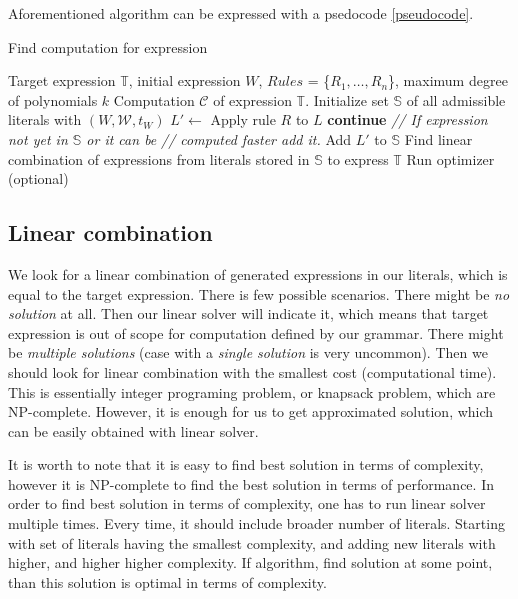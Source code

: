 \documentclass{article}
\begin{document}
Aforementioned algorithm can be expressed with a psedocode \ref{pseudocode}.

\begin{algorithm}
\caption{Find computation for expression}
\begin{algorithmic} 
\REQUIRE Target expression $\mathbb{T}$, initial expression $W$, $Rules$ = \{$R_1, \dots, R_n$\}, maximum degree of polynomials $k$
\ENSURE Computation $\mathcal{C}$ of expression $\mathbb{T}$.
\STATE Initialize set $\mathbb{S}$ of all admissible literals with $(W, \mathcal{W}, t_W)$
\STATE $L' \gets$ Apply rule $R$ to $L$
  \STATE \textbf{continue}
\ENDIF
\STATE \emph{// If expression not yet in $\mathbb{S}$ or it can be}
\STATE \emph{// computed faster add it.}
  \STATE Add $L'$ to $\mathbb{S}$
\ENDIF
\ENDFOR
\ENDFOR
\ENDWHILE
\STATE Find linear combination of expressions from literals stored in $\mathbb{S}$ to express $\mathbb{T}$
\STATE Run optimizer (optional)
\end{algorithmic}
\label{pseudocode}
\end{algorithm}


\subsection{Linear combination}
We look for a linear combination of generated expressions in our literals, which is equal to the
target expression. There is few possible scenarios. There might be \emph{no solution} at all. 
Then our linear solver will indicate it, which means that target expression
is out of scope for computation defined by our grammar. There might be \emph{multiple solutions} (case
with a \emph{single solution} is very uncommon). Then we should look for linear combination
with the smallest cost (computational time). 
This is essentially integer programing problem, or knapsack problem, which 
are NP-complete. However, it is enough for us to get approximated solution, which can be easily
obtained with linear solver. 

It is worth to note that it is easy to find best solution in terms of complexity, however it 
is NP-complete to find the best solution in terms of performance. In order to find best solution in terms
of complexity, one has to run linear solver multiple times. Every time, it should include broader number
of literals. Starting with set of literals having the smallest complexity, and adding new literals with
higher, and higher higher complexity. If algorithm, find solution at some point, than this solution is optimal
in terms of complexity.
\end{document}
